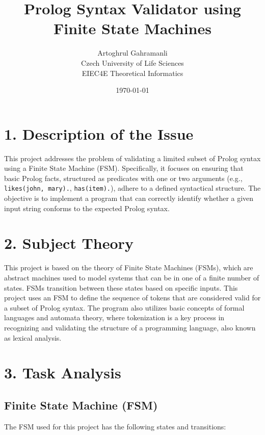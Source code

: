 \documentclass{article}
\title{Prolog Syntax Validator using Finite State Machines}
\author{Artoghrul Gahramanli \\ Czech University of Life Sciences \\ EIEC4E Theoretical Informatics}
\date{\today}
\begin{document}
\maketitle

\section*{1. Description of the Issue}

This project addresses the problem of validating a limited subset of Prolog syntax using a Finite State Machine (FSM). Specifically, it focuses on ensuring that basic Prolog facts, structured as predicates with one or two arguments (e.g., \texttt{likes(john, mary).}, \texttt{has(item).}), adhere to a defined syntactical structure. The objective is to implement a program that can correctly identify whether a given input string conforms to the expected Prolog syntax.

\section*{2. Subject Theory}

This project is based on the theory of Finite State Machines (FSMs), which are abstract machines used to model systems that can be in one of a finite number of states. FSMs transition between these states based on specific inputs. This project uses an FSM to define the sequence of tokens that are considered valid for a subset of Prolog syntax. The program also utilizes basic concepts of formal languages and automata theory, where tokenization is a key process in recognizing and validating the structure of a programming language, also known as lexical analysis.

\section*{3. Task Analysis}

\subsection*{Finite State Machine (FSM)}

The FSM used for this project has the following states and transitions:
\end{document}
